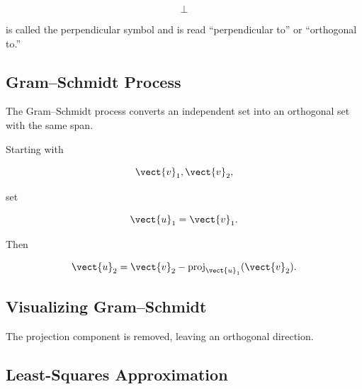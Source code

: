 \[ \perp \]

is called the perpendicular symbol and is read ``perpendicular to'' or
``orthogonal to.''

\subsection{Gram--Schmidt Process}
\label{subsec:gram-schmidt}

The Gram--Schmidt process converts an independent set into an orthogonal set
with the same span.

Starting with

\[ \vect{v}_1,\vect{v}_2, \]

set

\[ \vect{u}_1=\vect{v}_1. \]

Then

\[ \vect{u}_2
=
\vect{v}_2-\operatorname{proj}_{\vect{u}_1}(\vect{v}_2). \]

\subsection{Visualizing Gram--Schmidt}
\label{subsec:visual-gram-schmidt}

\begin{center}
\end{center}

The projection component is removed, leaving an orthogonal direction.

\subsection{Least-Squares Approximation}
\label{subsec:least-squares}

